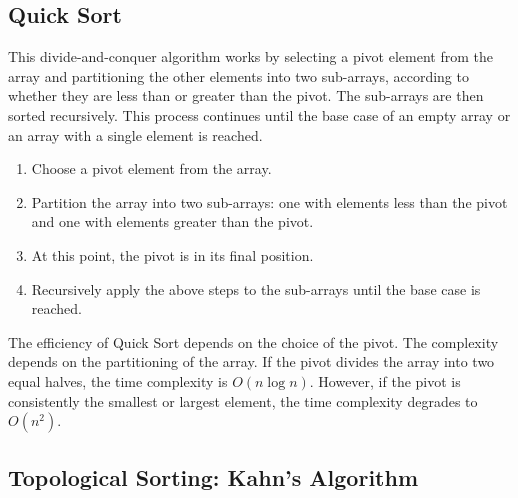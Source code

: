 \subsection{Quick Sort}

This divide-and-conquer algorithm works by selecting a pivot element from the array and partitioning the other elements into two sub-arrays, according to whether they are less than or greater than the pivot. The sub-arrays are then sorted recursively. This process continues until the base case of an empty array or an array with a single element is reached.
\begin{enumerate}
    \item Choose a pivot element from the array.
    \item Partition the array into two sub-arrays: one with elements less than the pivot and one with elements greater than the pivot.
    \item At this point, the pivot is in its final position.
    \item Recursively apply the above steps to the sub-arrays until the base case is reached.
\end{enumerate}

The efficiency of Quick Sort depends on the choice of the pivot. The complexity depends on the partitioning of the array. If the pivot divides the array into two equal halves, the time complexity is $O(n \log n)$. However, if the pivot is consistently the smallest or largest element, the time complexity degrades to $O(n^2)$.

\subsection{Topological Sorting: Kahn's Algorithm}


